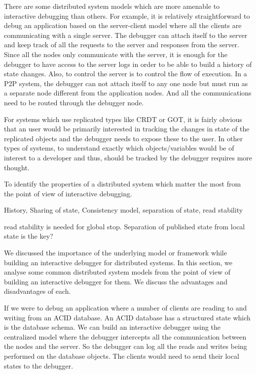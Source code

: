 There are some distributed system models which are more amenable to interactive debugging than others. For example, it is relatively straightforward to debug an application based on the server-client model where all the clients are communicating with a single server. The debugger can attach itself to the server and keep track of all the requests to the server and responses from the server. Since all the nodes only communicate with the server, it is enough for the debugger to have access to the server logs in order to be able to build a history of state changes. Also, to control the server is to control the flow of execution. In a P2P system, the debugger can not attach itself to any one node but must run as a separate node different from the application nodes. And all the communications need to be routed through the debugger node.

For systems which use replicated types like CRDT or GOT, it is fairly obvious that an user would be primarily interested in tracking the changes in state of the replicated objects and the debugger needs to expose these to the user. In other types of systems, to understand exactly which objects/variables would be of interest to a developer and thus, should be tracked by the debugger requires more thought. 

To identify the properties of a distributed system  which matter the most from the point of view of interactive debugging.

History, Sharing of state, Consistency model, separation of state, read stability

read stability is needed for global stop. Separation of published state from local state is the key?

We discussed the importance of the underlying model or framework while building an interactive debugger for distributed systems. In this section, we analyse some common distributed system models from the point of view of building an interactive debugger for them. We discuss the advantages and disadvantages of each.

If we were to debug an application where a number of clients are reading to and writing from an ACID database. An  ACID database has a structured state  which is the database schema. We can build an interactive debugger using the centralized model where the debugger intercepts all the communication between the nodes and the server. So the debugger can log all the reads and writes being performed on the database objects. The clients would need to send their local states to the debugger.

